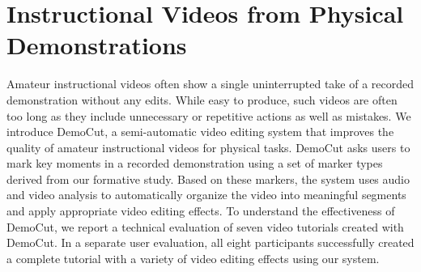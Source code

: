 \chapter{Instructional Videos from Physical Demonstrations}

  Amateur instructional videos often show a single
  uninterrupted take of a recorded demonstration without any edits.
  While easy to produce, such videos are often too long as they
  include unnecessary or repetitive actions as well as mistakes. We introduce
  DemoCut, a semi-automatic video editing system that improves the quality of amateur instructional videos for physical
  tasks. DemoCut asks users to mark key moments in a recorded demonstration using a set of marker types derived from our formative study.
  Based on these markers, the system uses audio and video analysis to automatically
  organize the video into meaningful segments and apply appropriate
  video editing effects.
  To understand the effectiveness of DemoCut, we report a technical evaluation of seven video tutorials created with DemoCut. In a separate user evaluation, all eight participants successfully created a complete tutorial with a variety of video editing effects using our system.












